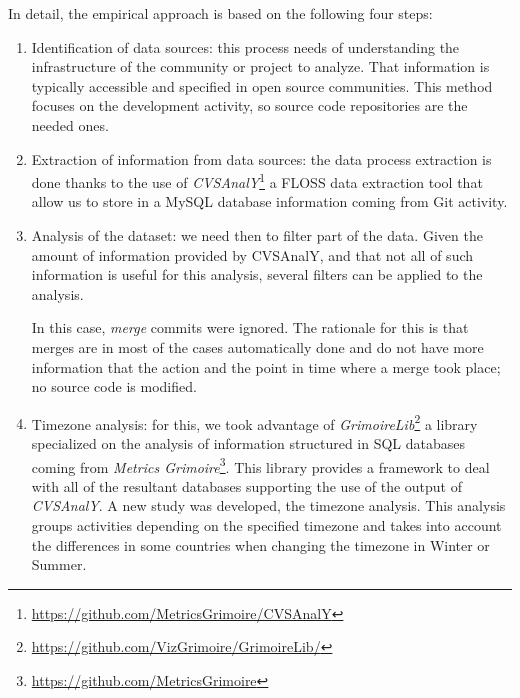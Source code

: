 \documentclass{sig-alternate-05-2015}
\begin{document}
In detail, the empirical approach is based on the following four steps:

\begin{enumerate}
\item Identification of data sources: this process needs of understanding the
infrastructure of the community or project to analyze. That information is
typically accessible and specified in open source communities. This method
focuses on the development activity, so source code repositories are the
needed ones.

\item Extraction of information from data sources: the data process extraction
is done thanks to the use of
\emph{CVSAnalY}\footnote{\url{https://github.com/MetricsGrimoire/CVSAnalY}}
 a FLOSS data extraction tool that allow us to store in a MySQL
database information coming from Git activity.

\item Analysis of the dataset: we need then to filter part of the data.
Given the amount of information provided by CVSAnalY, and that not all of
such information is useful for this analysis, several filters can be applied
to the analysis.

In this case, \emph{merge} commits were ignored. The rationale
for this is that merges are in most of the cases automatically done and do not
have more information that the action and the point in time where a merge took place; no source code is modified.

\item Timezone analysis: for this, we took advantage of
\emph{GrimoireLib}\footnote{\url{https://github.com/VizGrimoire/GrimoireLib/}} a library
specialized on the analysis of information structured in SQL databases coming from
\emph{Metrics Grimoire}\footnote{\url{https://github.com/MetricsGrimoire}}. This library provides
a framework to deal with all of the resultant databases supporting the use of the
output of \emph{CVSAnalY}. A new study was developed, the timezone analysis. This analysis
groups activities depending on the specified timezone and takes into account the
differences in some countries when changing the timezone in Winter or Summer.


\end{enumerate}
\end{document}
